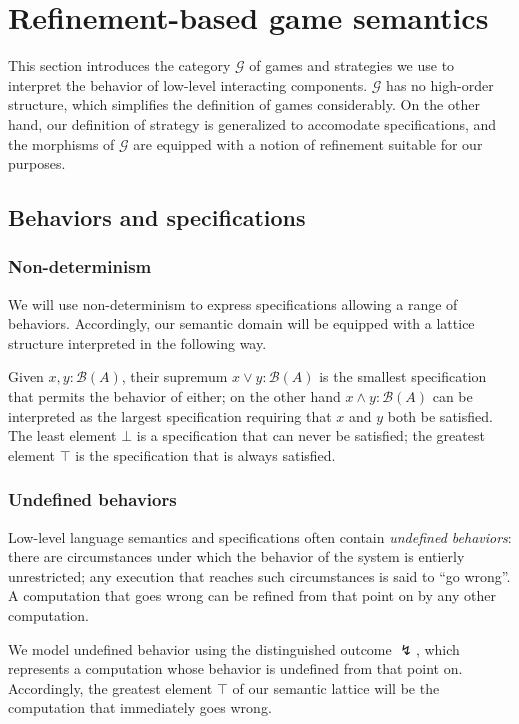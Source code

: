 \section{Refinement-based game semantics}

This section introduces the category $\mathcal{G}$ of games and strategies
we use to interpret the behavior of low-level interacting components.
$\mathcal{G}$ has no high-order structure,
which simplifies the definition of games considerably.
On the other hand,
our definition of strategy is generalized to accomodate specifications,
and the morphisms of $\mathcal{G}$ are equipped with a notion of refinement
suitable for our purposes.

\subsection{Behaviors and specifications} %

\subsubsection{Non-determinism} %

We will use non-determinism
to express specifications allowing a range of behaviors.
Accordingly,
our semantic domain will be equipped with a lattice structure
interpreted in the following way.

Given $x, y : \mathcal{B}(A)$,
their supremum $x \vee y : \mathcal{B}(A)$
is the smallest specification that permits the behavior of either;
on the other hand $x \wedge y : \mathcal{B}(A)$ can be interpreted as
the largest specification requiring that $x$ and $y$ both be satisfied.
The least element $\bot$
is a specification that can never be satisfied;
the greatest element $\top$
is the specification that is always satisfied.


\subsubsection{Undefined behaviors} %

Low-level language semantics and specifications
often contain \emph{undefined behaviors}:
there are circumstances under which the behavior of the system
is entierly unrestricted;
any execution that reaches such circumstances is said to ``go wrong''.
A computation that goes wrong can be refined
from that point on by any other computation.

We model undefined behavior using the distinguished outcome $\lightning$,
which represents a computation whose behavior is undefined
from that point on.
Accordingly,
the greatest element $\top$ of our semantic lattice
will be the computation that immediately goes wrong.

